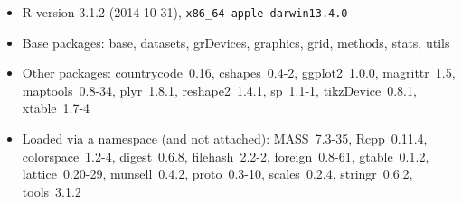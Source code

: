 \begin{itemize}\raggedright
  \item R version 3.1.2 (2014-10-31), \verb|x86_64-apple-darwin13.4.0|
  \item Base packages: base, datasets, grDevices, graphics, grid,
    methods, stats, utils
  \item Other packages: countrycode~0.16, cshapes~0.4-2, ggplot2~1.0.0,
    magrittr~1.5, maptools~0.8-34, plyr~1.8.1, reshape2~1.4.1,
    sp~1.1-1, tikzDevice~0.8.1, xtable~1.7-4
  \item Loaded via a namespace (and not attached): MASS~7.3-35,
    Rcpp~0.11.4, colorspace~1.2-4, digest~0.6.8, filehash~2.2-2,
    foreign~0.8-61, gtable~0.1.2, lattice~0.20-29, munsell~0.4.2,
    proto~0.3-10, scales~0.2.4, stringr~0.6.2, tools~3.1.2
\end{itemize}
